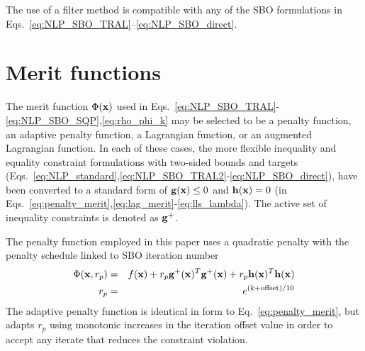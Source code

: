 The use of a filter method is compatible with any of the SBO
formulations in Eqs.~\ref{eq:NLP_SBO_TRAL}--\ref{eq:NLP_SBO_direct}.

\section{Merit functions} \label{sbm:sblm_con_merit}


The merit function $\Phi({\bf x})$ used in
Eqs.~\ref{eq:NLP_SBO_TRAL}-\ref{eq:NLP_SBO_SQP},\ref{eq:rho_phi_k} may be
selected to be a penalty function, an adaptive penalty function, a
Lagrangian function, or an augmented Lagrangian function.  In each of
these cases, the more flexible inequality and equality constraint
formulations with two-sided bounds and targets
(Eqs.~\ref{eq:NLP_standard},\ref{eq:NLP_SBO_TRAL2}-\ref{eq:NLP_SBO_direct}), 
have been converted to a standard form of ${\bf g}({\bf x}) \le 0$ and
${\bf h}({\bf x}) = 0$ (in
Eqs.~\ref{eq:penalty_merit},\ref{eq:lag_merit}-\ref{eq:lls_lambda}).
The active set of inequality constraints is denoted as ${\bf g}^+$.

The penalty function employed in this paper uses a quadratic penalty
with the penalty schedule linked to SBO iteration number
\begin{eqnarray}
\Phi({\bf x}, r_p) & = & f({\bf x})
+ r_p {\bf g}^+({\bf x})^T {\bf g}^+({\bf x})
+ r_p {\bf h}({\bf x})^T {\bf h}({\bf x}) \label{eq:penalty_merit} \\
r_p & = & e^{(k + {\rm offset})/10} %
\label{eq:exp_rp}
\end{eqnarray}
The adaptive penalty function is identical in form to
Eq.~\ref{eq:penalty_merit}, but adapts $r_p$ using monotonic increases
in the iteration offset value in order to accept any iterate that
reduces the constraint violation.

